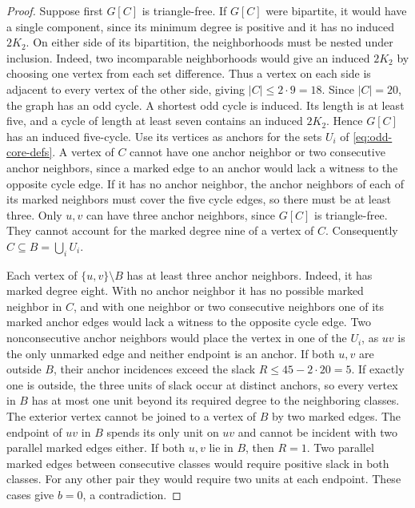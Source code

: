 \documentclass[preprint,11pt,numbers]{elsarticle-arxiv}
\numberwithin{equation}{section}
\theoremstyle{definition}
\begin{document}
\begin{proof}
Suppose first $G[C]$ is triangle-free. If $G[C]$ were
bipartite, it would have a single component, since its minimum
degree is positive and it has no induced $2K_2$. On either side
of its bipartition, the neighborhoods must be nested under
inclusion. Indeed, two incomparable neighborhoods would give
an induced $2K_2$ by choosing one vertex from each set
difference. Thus a vertex on each side is adjacent to every
vertex of the other side, giving $|C|\le2\cdot9=18$.
Since $|C|=20$, the graph has an odd cycle. A shortest odd
cycle is induced. Its length is at least five, and a cycle
of length at least seven contains an induced $2K_2$. Hence
$G[C]$ has an induced five-cycle. Use its vertices as anchors
for the sets $U_i$ of \eqref{eq:odd-core-defs}.
A vertex of $C$ cannot have one anchor neighbor or two
consecutive anchor neighbors, since a marked edge to an
anchor would lack a witness to the opposite cycle edge.
If it has no anchor neighbor, the anchor neighbors of
each of its marked neighbors must cover the five cycle
edges, so there must be at least three. Only $u,v$ can
have three anchor neighbors, since $G[C]$ is triangle-free.
They cannot account for the marked degree nine of a vertex
of $C$. Consequently $C\subseteq B=\bigcup_i U_i$.

Each vertex of $\{u,v\}\setminus B$ has at least three
anchor neighbors. Indeed, it has marked degree eight.
With no anchor neighbor it has no possible marked neighbor
in $C$, and with one neighbor or two consecutive neighbors
one of its marked anchor edges would lack a witness to the
opposite cycle edge. Two nonconsecutive anchor neighbors would
place the vertex in one of the $U_i$, as $uv$ is the only unmarked
edge and neither endpoint is an anchor. If both $u,v$ are outside
$B$, their anchor incidences exceed the slack $R\le45-2\cdot20=5$. If
exactly one is outside, the three units of slack occur at
distinct anchors, so every vertex in $B$ has at most one
unit beyond its required degree to the neighboring classes.
The exterior vertex cannot be joined to a vertex of $B$ by two marked edges.
The endpoint of $uv$ in $B$ spends its only unit on $uv$
and cannot be incident with two parallel marked edges either.
If both $u,v$ lie in $B$, then $R=1$. Two parallel marked edges
between consecutive classes would require positive slack in both
classes. For any other pair they would require two units at each
endpoint. These
cases give $b=0$, a contradiction.


\end{proof}
\end{document}
